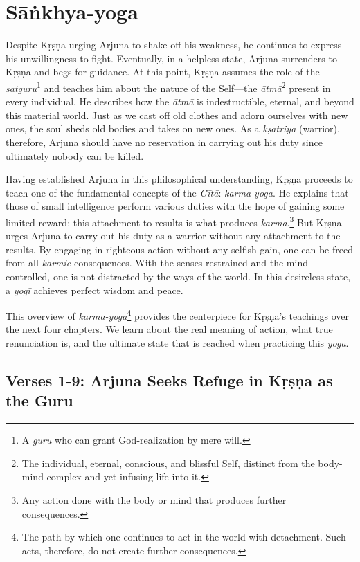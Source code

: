 \chapter{Sāṅkhya-yoga}\label{chap-sankhya-yoga}

\noindent Despite Kṛṣṇa urging Arjuna to shake off his weakness, he continues to express his unwillingness to fight. Eventually, in a helpless state, Arjuna surrenders to Kṛṣṇa and begs for guidance. At this point, Kṛṣṇa assumes the role of the \textit{satguru}\footnote{A \textit{guru} who can grant God-realization by mere will.} and teaches him about the nature of the Self---the \textit{ātmā}\footnote{The individual, eternal, conscious, and blissful Self, distinct from the body-mind complex and yet infusing life into it.} present in every individual. He describes how the \textit{ātmā} is indestructible, eternal, and beyond this material world. Just as we cast off old clothes and adorn ourselves with new ones, the soul sheds old bodies and takes on new ones. As a \textit{kṣatriya} (warrior), therefore, Arjuna should have no reservation in carrying out his duty since ultimately nobody can be killed.

Having established Arjuna in this philosophical understanding, Kṛṣṇa proceeds to teach one of the fundamental concepts of the \textit{Gītā}: \textit{karma-yoga}. He explains that those of small intelligence perform various duties with the hope of gaining some limited reward; this attachment to results is what produces \textit{karma}.\footnote{Any action done with the body or mind that produces further consequences.} But Kṛṣṇa urges Arjuna to carry out his duty as a warrior without any attachment to the results. By engaging in righteous action without any selfish gain, one can be freed from all \textit{karmic} consequences. With the senses restrained and the mind controlled, one is not distracted by the ways of the world. In this desireless state, a \textit{yogī} achieves perfect wisdom and peace.

This overview of \textit{karma-yoga}\footnote{The path by which one continues to act in the world with detachment. Such acts, therefore, do not create further consequences.
} provides the centerpiece for Kṛṣṇa's teachings over the next four chapters. We learn about the real meaning of action, what true renunciation is, and the ultimate state that is reached when practicing this \textit{yoga}.

\section{Verses 1-9: Arjuna Seeks Refuge in Kṛṣṇa as the Guru}\label{sec-verses-1-9-arjuna-seeks-refuge-in-krsna-as-the-guru}


